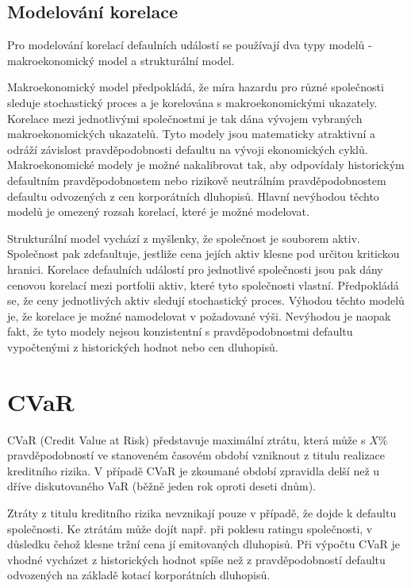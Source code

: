 \documentclass[a4paper]{book}
\begin{document}
\subsection{Modelování korelace}

Pro modelování korelací defaulních událostí se používají dva typy modelů - makroekonomický model a strukturální model.

Makroekonomický model předpokládá, že míra hazardu pro různé společnosti sleduje stochastický proces a je korelována s makroekonomickými ukazately. Korelace mezi jednotlivými společnostmi je tak dána vývojem vybraných makroekonomických ukazatelů. Tyto modely jsou matematicky atraktivní a odráží závislost pravděpodobnosti defaultu na vývoji ekonomických cyklů. Makroekonomické modely je možné nakalibrovat tak, aby odpovídaly historickým defaultním pravděpodobnostem nebo rizikově neutrálním pravděpodobnostem defaultu odvozených z cen korporátních dluhopisů. Hlavní nevýhodou těchto modelů je omezený rozsah korelací, které je možné modelovat.

Strukturální model vychází z myšlenky, že společnost je souborem aktiv. Společnost pak zdefaultuje, jestliže cena jejích aktiv klesne pod určitou kritickou hranici. Korelace defaulních událostí pro jednotlivé společnosti jsou pak dány cenovou korelací mezi portfolii aktiv, které tyto společnosti vlastní. Předpokládá se, že ceny jednotlivých aktiv sledují stochastický proces. Výhodou těchto modelů je, že korelace je možné namodelovat v požadované výši. Nevýhodou je naopak fakt, že tyto modely nejsou konzistentní s pravděpodobnostmi defaultu vypočtenými z historických hodnot nebo cen dluhopisů.

\section{CVaR}

CVaR (Credit Value at Risk) představuje maximální ztrátu, která může s $X$\% pravděpodobností ve stanoveném časovém období vzniknout z titulu realizace kreditního rizika. V případě CVaR je zkoumané období zpravidla delší než u dříve diskutovaného VaR (běžně jeden rok oproti deseti dnům).

Ztráty z titulu kreditního rizika nevznikají pouze v případě, že dojde k defaultu společnosti. Ke ztrátám může dojít např. při poklesu ratingu společnosti, v důsledku čehož klesne tržní cena jí emitovaných dluhopisů. Při výpočtu CVaR je vhodné vycházet z historických hodnot spíše než z pravděpodobností defaultu odvozených na základě kotací korporátních dluhopisů.
\end{document}
